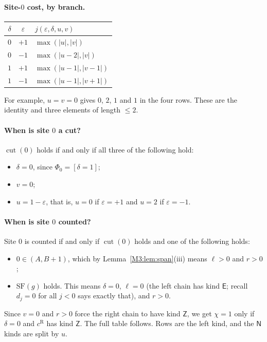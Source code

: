 \documentclass[11pt]{article}
\theoremstyle{plain}
\theoremstyle{definition}
\theoremstyle{remark}
\begin{document}
\paragraph{Site-$0$ cost, by branch.}
\begin{center}
\begin{tabular}{c|c|l}
$\delta$ & $\varepsilon$ & $j(\varepsilon,\delta,u,v)$\\\hline
$0$ & $+1$ & $\max(|u|,|v|)$\\
$0$ & $-1$ & $\max(|u-2|,|v|)$\\
$1$ & $+1$ & $\max(|u-1|,|v-1|)$\\
$1$ & $-1$ & $\max(|u-1|,|v+1|)$
\end{tabular}
\end{center}
For example, $u=v=0$ gives $0$, $2$, $1$ and $1$ in the four rows. These are the identity
and three elements of length $\le2$.

\paragraph{When is site $0$ a cut?}
$\operatorname{cut}(0)$ holds if and only if all three of the following hold:
\begin{itemize}
\item $\delta=0$, since $\Phi_0=[\delta=1]$;
\item $v=0$;
\item $u=1-\varepsilon$, that is, $u=0$ if $\varepsilon=+1$ and $u=2$ if $\varepsilon=-1$.
\end{itemize}

\paragraph{When is site $0$ counted?}
Site $0$ is counted if and only if $\operatorname{cut}(0)$ holds and one of the following
holds:
\begin{itemize}
\item[(I)] $0\in(A,B+1)$, which by Lemma~\ref{M3:lem:span}(iii) means $\ell>0$ and $r>0$;
\item[(S)] $\mathrm{SF}(g)$ holds. This means $\delta=0$, $\ell=0$ (the left chain has kind
  $\mathsf E$; recall $d_j=0$ for all $j<0$ says exactly that), and $r>0$.
\end{itemize}
Since $v=0$ and $r>0$ force the right chain to have kind $\mathsf Z$, we get $\chi=1$ only if
$\delta=0$ and $c^{\mathrm R}$ has kind $\mathsf Z$. The full table follows. Rows are the
left kind, and the $\mathsf N$ kinds are split by $u$.
\end{document}
